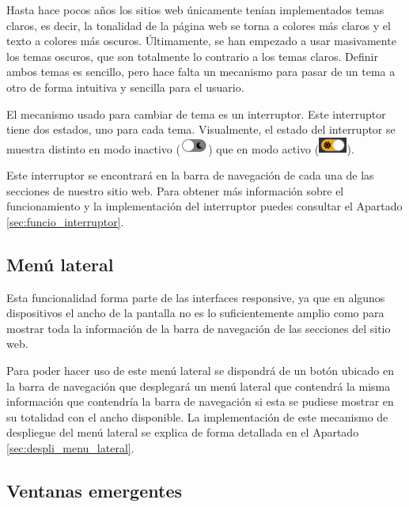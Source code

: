 Hasta hace pocos años los sitios web únicamente tenían implementados temas claros, es decir, la tonalidad de la página web se torna a colores más claros y el texto a colores más oscuros. Últimamente, se han empezado a usar masivamente los temas oscuros, que son totalmente lo contrario a los temas claros. Definir ambos temas es sencillo, pero hace falta un mecanismo para pasar de un tema a otro de forma intuitiva y sencilla para el usuario.

El mecanismo usado para cambiar de tema es un interruptor. Este interruptor tiene dos estados, uno para cada tema. Visualmente, el estado del interruptor se muestra distinto en modo inactivo (\includegraphics[width=0.07\textwidth]{imagenes/07_Implementacion/switch_inactive.png}) que en modo activo (\includegraphics[width=0.07\textwidth]{imagenes/07_Implementacion/switch_active.png}).

Este interruptor se encontrará en la barra de navegación de cada una de las secciones de nuestro sitio web. Para obtener más información sobre el funcionamiento y la implementación del interruptor puedes consultar el Apartado \ref{sec:funcio_interruptor}.

\subsection{Menú lateral}

Esta funcionalidad forma parte de las interfaces responsive, ya que en algunos dispositivos el ancho de la pantalla no es lo suficientemente amplio como para mostrar toda la información de la barra de navegación de las secciones del sitio web.

Para poder hacer uso de este menú lateral se dispondrá de un botón ubicado en la barra de navegación que desplegará un menú lateral que contendrá la misma información que contendría la barra de navegación si esta se pudiese mostrar en su totalidad con el ancho disponible. La implementación de este mecanismo de despliegue del menú lateral se explica de forma detallada en el Apartado \ref{sec:despli_menu_lateral}.

\subsection{Ventanas emergentes}

